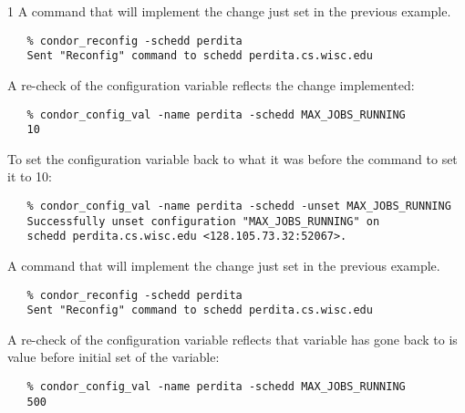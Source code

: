 \begin{ManPage}{\label{man-condor-config-val}}{1}
A command that will implement the change just set in the previous
example.
\footnotesize
\begin{verbatim}
   % condor_reconfig -schedd perdita
   Sent "Reconfig" command to schedd perdita.cs.wisc.edu
\end{verbatim}
\normalsize

A re-check of the configuration variable reflects the change implemented:
\footnotesize
\begin{verbatim}
   % condor_config_val -name perdita -schedd MAX_JOBS_RUNNING
   10
\end{verbatim}
\normalsize

To set the configuration variable 
back to what it was before the command to set it to 10:
\footnotesize
\begin{verbatim}
   % condor_config_val -name perdita -schedd -unset MAX_JOBS_RUNNING
   Successfully unset configuration "MAX_JOBS_RUNNING" on 
   schedd perdita.cs.wisc.edu <128.105.73.32:52067>.
\end{verbatim}
\normalsize

A command that will implement the change just set in the previous
example.
\footnotesize
\begin{verbatim}
   % condor_reconfig -schedd perdita
   Sent "Reconfig" command to schedd perdita.cs.wisc.edu
\end{verbatim}
\normalsize

A re-check of the configuration variable reflects that variable
has gone back to is value before initial set of the variable:
\footnotesize
\begin{verbatim}
   % condor_config_val -name perdita -schedd MAX_JOBS_RUNNING
   500
\end{verbatim}
\normalsize

\end{ManPage}
